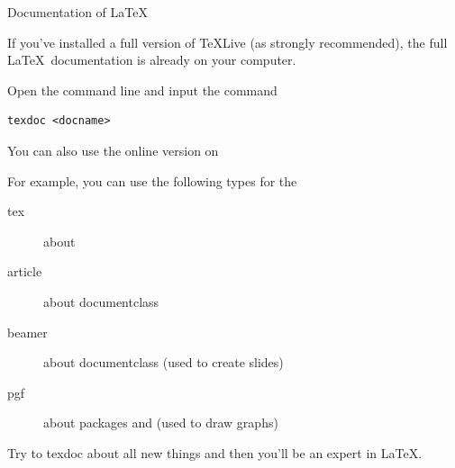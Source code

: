 \begin{frame}[fragile]{Documentation of \LaTeX}

    If you've installed a full version of \TeX Live (as strongly recommended), the full \LaTeX\ documentation is already on your computer. \medskip

    Open the command line and input the command

    \begin{verbatim}
texdoc <docname>
    \end{verbatim}

    You can also use the online version on  \medskip

    For example, you can use the following types for the 
    \begin{description}
        \item[tex] 		about \structure{\TeX}
        \item[article] 	about documentclass 
        \item[beamer] 	about documentclass  (used to create slides)
        \item[pgf]		about packages  and  (used to draw graphs)
    \end{description}
    \smallskip
    Try to \alert{texdoc} about all new things and then you'll be an expert in \LaTeX.
\end{frame}
